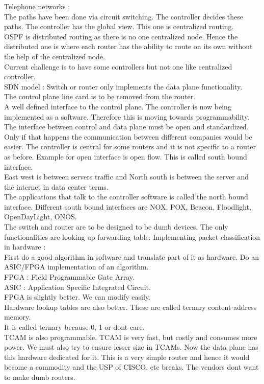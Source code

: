 \documentclass[solution,addpoints,12pt]{exam}
\begin{document}
Telephone networks :\\
The paths have been done via circuit switching. The controller
decides these paths. The controller has the global view. This one is
centralized routing.\\

OSPF is distributed routing as there is
no one centralized node. Hence the distributed one is where each
router has the ability to route on its own without the
help of the centralized node.\\

Current challenge is to have some controllers but not one like
centralized controller.\\

SDN model : Switch or router only implements the data plane functionality.\\
The control plane line card is to be removed from the router.\\
A well defined interface to the control plane. The controller
is now being implemented as a software. Therefore this is moving towards
programmability. The interface between control and data plane must be
open and standardized. Only if that happens the communication between
different companies would be easier. The controller is central for
some routers and it is not specific to a router as before. Example for
open interface is open flow. This is called south bound interface.\\

East west is between servers traffic and  North south is between the server
and the internet in data center terms.\\

The applications that talk to the controller software is called the
north bound interface. Different south bound interfaces are NOX,
POX, Beacon, Floodlight, OpenDayLight, ONOS.\\

The switch and router are to be designed to be dumb devices.
The only functionalities are looking up forwarding table.
Implementing packet classification in hardware :\\
First do a good algorithm in software and translate part of
it as hardware. Do an ASIC/FPGA implementation of an algorithm.\\
FPGA : Field Programmable Gate Array.\\
ASIC : Application Specific Integrated Circuit.\\
FPGA is slightly better. We can modify easily.\\
Hardware lookup tables are also better.
These are called ternary content address memory.\\
It is called ternary because 0, 1 or dont care.\\
TCAM is also programmable. TCAM is very fast, but costly
and consumes more power. We must also try to ensure
lesser size in TCAMs. Now the data plane has this
hardware dedicated for it. This is a very simple router
and hence it would become a commodity and the USP of
CISCO, etc breaks. The vendors dont want to make dumb
routers.\\
\end{document}
